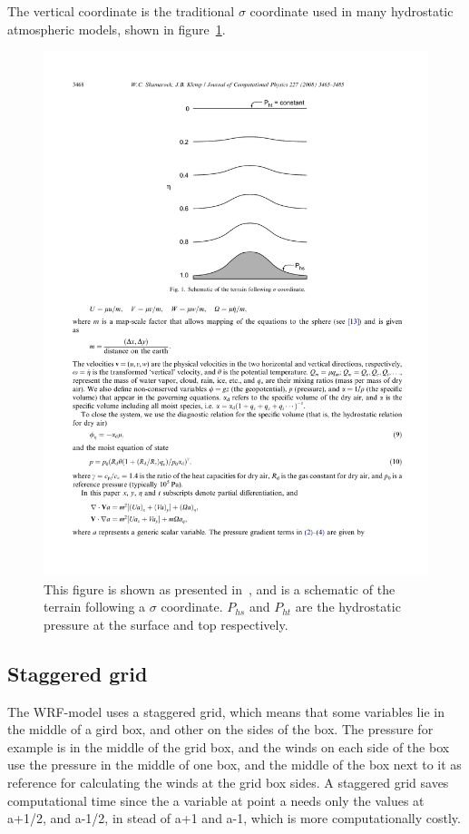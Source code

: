 The vertical coordinate is the traditional $\sigma$ coordinate used in many hydrostatic atmospheric models, shown in figure~\ref{fig:sigma}.
\begin{figure}[h]
\centering
\includegraphics[scale=0.9]{model_methods/sigma.pdf}
\caption{This figure is shown as presented in~\citet{Skamarock2008}, and is a schematic of the terrain following a $\sigma$ coordinate. $P_{hs}$ and $P_{ht}$ are the hydrostatic pressure at the surface and top respectively.}
\label{fig:sigma}
\end{figure}



\subsection{Staggered grid}
The WRF-model uses a staggered grid, which means that some variables lie in the middle of a gird box, and other on the sides of the box. The pressure for example is in the middle of the grid box, and the winds on each side of the box use the pressure in the middle of one box, and the middle of the box next to it as reference for calculating the winds at the grid box sides. A staggered grid saves computational time since the a variable at point a needs only the values at a+1/2, and a-1/2, in stead of a+1 and a-1, which is more computationally costly.

